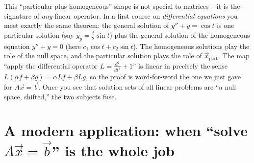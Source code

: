 \begin{connectionbox}
This ``particular plus homogeneous'' shape is not special to matrices -- it
is the signature of \emph{any} linear operator. In a first course on
\emph{differential equations} you meet exactly the same theorem: the general
solution of $y'' + y = \cos t$ is one particular solution (say
$y_p=\tfrac{t}{2}\sin t$) plus the general solution of the homogeneous
equation $y''+y=0$ (here $c_1\cos t + c_2\sin t$). The homogeneous solutions
play the role of the null space, and the particular solution plays the role
of $\vec x_{\text{part}}$. The map ``apply the differential operator
$L=\tfrac{d^2}{dt^2}+1$'' is linear in precisely the sense
$L(\alpha f+\beta g)=\alpha L f+\beta Lg$, so the proof is word-for-word the
one we just gave for $A\vec x=\vec b$. Once you see that solution sets of all
linear problems are ``a null space, shifted,'' the two subjects fuse.
\end{connectionbox}

\section{A modern application: when ``solve $A\vec x=\vec b$'' is the whole job}

